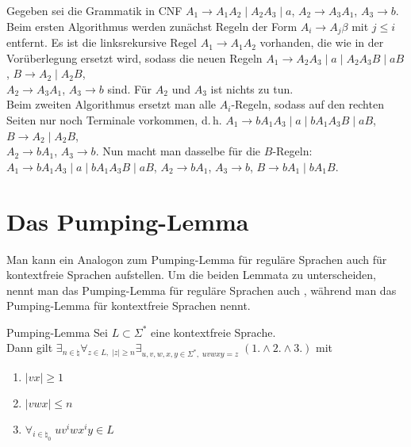 \linie

\begin{Bsp}
    Gegeben sei die Grammatik in CNF
    $A_1 \rightarrow A_1 A_2 \;|\; A_2 A_3 \;|\; a$,\quad
    $A_2 \rightarrow A_3 A_1$,\quad
    $A_3 \rightarrow b$.\\
    Beim ersten Algorithmus werden zunächst Regeln der Form
    $A_i \rightarrow A_j \beta$ mit $j \le i$ entfernt.
    Es ist die linksrekursive Regel $A_1 \rightarrow A_1 A_2$ vorhanden,
    die wie in der Vorüberlegung ersetzt wird, sodass die neuen Regeln
    $A_1 \rightarrow A_2 A_3 \;|\; a \;|\; A_2 A_3 B \;|\; a B$,\quad
    $B \rightarrow A_2 \;|\; A_2 B$,\\
    $A_2 \rightarrow A_3 A_1$,\quad
    $A_3 \rightarrow b$ sind.
    Für $A_2$ und $A_3$ ist nichts zu tun.\\
    Beim zweiten Algorithmus ersetzt man alle $A_i$-Regeln, sodass auf den
    rechten Seiten nur noch Terminale vorkommen, d.\,h.
    $A_1 \rightarrow b A_1 A_3 \;|\; a \;|\; b A_1 A_3 B \;|\; a B$,\quad
    $B \rightarrow A_2 \;|\; A_2 B$,\\
    $A_2 \rightarrow b A_1$,\quad
    $A_3 \rightarrow b$.
    Nun macht man dasselbe für die $B$-Regeln:\\
    $A_1 \rightarrow b A_1 A_3 \;|\; a \;|\; b A_1 A_3 B \;|\; a B$,\qquad
    $A_2 \rightarrow b A_1$,\qquad
    $A_3 \rightarrow b$,\qquad
    $B \rightarrow b A_1 \;|\; b A_1 B$.
\end{Bsp}

\pagebreak

\section{%
    Das Pumping-Lemma%
}

\begin{Bem}
    Man kann ein Analogon zum Pumping-Lemma für reguläre Sprachen auch für
    kontextfreie Sprachen aufstellen.
    Um die beiden Lemmata zu unterscheiden, nennt man das Pumping-Lemma für
    reguläre Sprachen auch , während man das
    Pumping-Lemma für kontextfreie Sprachen  nennt.
\end{Bem}

\begin{Satz}{Pumping-Lemma}
    Sei $L \subset \Sigma^\ast$ eine kontextfreie Sprache.\\
    Dann gilt
    $\exists_{n \in \natural} \forall_{z \in L,\; |z| \ge n}
    \exists_{u, v, w, x, y \in \Sigma^\ast,\; uvwxy = z}\;
    (1. \land 2. \land 3.)$ mit
    \begin{enumerate}
        \item
        $|vx| \ge 1$

        \item
        $|vwx| \le n$

        \item
        $\forall_{i \in \natural_0}\; u v^i w x^i y \in L$
    \end{enumerate}
\end{Satz}

